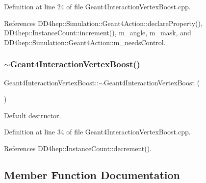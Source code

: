 Definition at line 24 of file Geant4\+Interaction\+Vertex\+Boost.\+cpp.



References D\+D4hep\+::\+Simulation\+::\+Geant4\+Action\+::declare\+Property(), D\+D4hep\+::\+Instance\+Count\+::increment(), m\+\_\+angle, m\+\_\+mask, and D\+D4hep\+::\+Simulation\+::\+Geant4\+Action\+::m\+\_\+needs\+Control.

\hypertarget{class_d_d4hep_1_1_simulation_1_1_geant4_interaction_vertex_boost_a06fa61bb33bf2286f1abb7b0af507b77}{}\label{class_d_d4hep_1_1_simulation_1_1_geant4_interaction_vertex_boost_a06fa61bb33bf2286f1abb7b0af507b77} 
\subsubsection{\texorpdfstring{$\sim$\+Geant4\+Interaction\+Vertex\+Boost()}{~Geant4InteractionVertexBoost()}}
{\footnotesize\ttfamily Geant4\+Interaction\+Vertex\+Boost\+::$\sim$\+Geant4\+Interaction\+Vertex\+Boost (\begin{DoxyParamCaption}{ }\end{DoxyParamCaption})\hspace{0.3cm}{\ttfamily [virtual]}}



Default destructor. 



Definition at line 34 of file Geant4\+Interaction\+Vertex\+Boost.\+cpp.



References D\+D4hep\+::\+Instance\+Count\+::decrement().



\subsection{Member Function Documentation}
\hypertarget{class_d_d4hep_1_1_simulation_1_1_geant4_interaction_vertex_boost_a2d38ef5a3c1e5a4377a1881ae50c7ddc}{}\label{class_d_d4hep_1_1_simulation_1_1_geant4_interaction_vertex_boost_a2d38ef5a3c1e5a4377a1881ae50c7ddc} 
